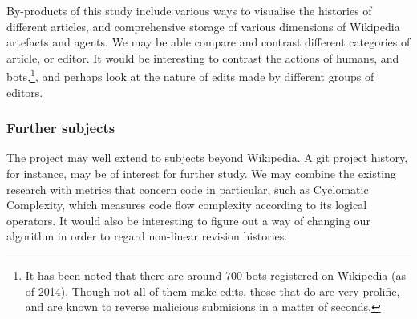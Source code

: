 \documentclass[a4paper,11pt,twoside,notitlepage]{article}
\begin{document}
        By-products of this study include various ways to
        visualise the histories of different articles, and
        comprehensive storage of various dimensions of Wikipedia
        artefacts and agents. We may be able compare and contrast
        different categories of article, or editor. It would be
        interesting to contrast the actions of humans, and
        bots,\footnote{It has been noted that there are around 700
          bots registered on Wikipedia (as of 2014). Though not all of
          them make edits, those that do are very prolific, and are
          known to reverse malicious submisions in a matter of
          seconds.\cite{wiki-bots}\cite{bbc-bots}}, and perhaps look
        at the nature of edits made by different groups of editors.

        \subsubsection*{Further subjects}
        The project may well extend to subjects beyond Wikipedia. A
        git project history, for instance, may be of interest for
        further study. We may combine the existing research with
        metrics that concern code in particular,
        such as Cyclomatic Complexity, which measures code flow
        complexity according to its logical
        operators.\cite{McCabe1976} It would also be interesting to
        figure out a way of changing our algorithm in order to regard
        non-linear revision histories.



\end{document}
